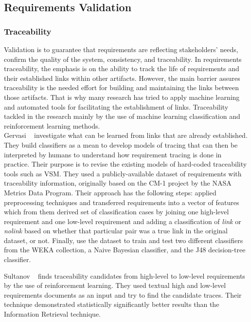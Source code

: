 \subsection{Requirements Validation}

\subsubsection{Traceability}

Validation is to guarantee that requirements are reflecting stakeholders' needs,
confirm the quality of the system, consistency, and traceability.
In requirements traceability, the emphasis is on the ability to track the life of
requirements and their established links within other artifacts. However, the
main barrier assures traceability is the needed effort for building and
maintaining the links between those artifacts. That is why many research has
tried to apply machine learning and automated tools for facilitating the
establishment of links\cite{Gervasi:2011}.
Traceability tackled in the research mainly by the use of machine learning
classification and reinforcement learning methods.\\

Gervasi \etal~\cite{Gervasi:2011} investigate what can be learned from links that are already established. They build classifiers as a mean to develop models of tracing that can then be interpreted by humans to understand how requirement tracing is done in practice. Their purpose is to revise the existing models of hard-coded traceability tools such as VSM. They used a publicly-available dataset of requirements with traceability information, originally based on the CM-1 project by the NASA Metrics Data Program. Their approach has the following steps: applied preprocessing techniques and transferred requirements into a vector of features which from them derived set of classification cases by joining one high-level requirement and one low-level requirement and adding a classification of \textit{link} or \textit{nolink} based on whether that particular pair was a true link in the original dataset, or not. Finally, use the dataset to train and test two different classifiers from the WEKA collection, a Naive Bayesian classifier, and the J48 decision-tree classifier.\newline

Sultanov \etal~\cite{Sultanov:2013} finds traceability candidates from
high-level to low-level requirements by the use of reinforcement
learning. They used textual high and low-level requirements documents as an input and try to
find the candidate traces. Their technique demonstrated statistically
significantly better results than the Information Retrieval technique.





